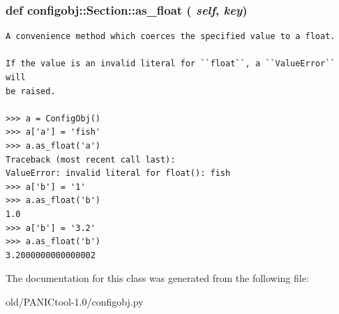 \subsubsection{\setlength{\rightskip}{0pt plus 5cm}def configobj::Section::as\_\-float ( {\em self},  {\em key})}\label{classconfigobj_1_1Section_3f13d36392963c5e215b810711f9f8c2}




\footnotesize\begin{verbatim}
A convenience method which coerces the specified value to a float.

If the value is an invalid literal for ``float``, a ``ValueError`` will
be raised.

>>> a = ConfigObj()
>>> a['a'] = 'fish'
>>> a.as_float('a')
Traceback (most recent call last):
ValueError: invalid literal for float(): fish
>>> a['b'] = '1'
>>> a.as_float('b')
1.0
>>> a['b'] = '3.2'
>>> a.as_float('b')
3.2000000000000002
\end{verbatim}
\normalsize
 

The documentation for this class was generated from the following file:\begin{CompactItemize}
\item 
old/PANICtool-1.0/configobj.py\end{CompactItemize}
